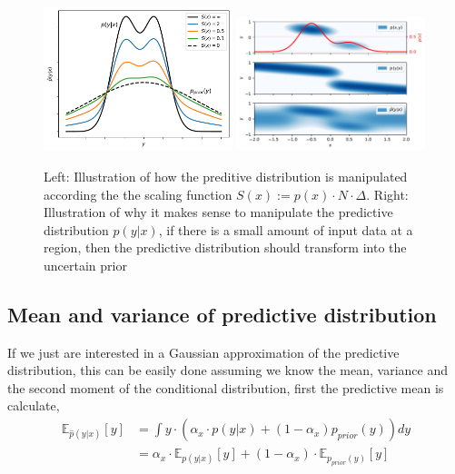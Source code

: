 \begin{figure}[H]
    \centering
    \includegraphics[trim=0.3cm 0cm 0.1cm 0.2cm,clip,width=0.49\textwidth]{Pictures/mixture_predictive_bayesian.pdf}
    \includegraphics[trim=0.3cm 0cm 0.1cm 0.2cm,clip,width=0.49\textwidth]{Pictures/mixture_predictive_bayesian2D.pdf}
    \caption{Left: Illustration of how the preditive distribution is manipulated according
    the the scaling function $S(x) := p(x)\cdot N\cdot \Delta$. Right: Illustration of why it makes
    sense to manipulate the predictive distribution $p(y|x)$, if there is a small amount of input data
    at a region, then the predictive distribution should transform into the uncertain prior}
    \label{pred_dist_manipulation}
\end{figure}

\subsection{Mean and variance of predictive distribution}\label{mean_variance_pred_mixture}
If we just are interested in a Gaussian approximation of the predictive
distribution, this can be easily done assuming we know the mean, variance
and the second moment of the conditional distribution, first the predictive mean
is calculate, 
\begin{align*}
    \mathbb{E}_{\hat p(y|x)}[y] &= \int y \cdot \left(\alpha_x \cdot p(y|x) + (1-\alpha_x) p_{prior}(y)\right) dy\\
    &= \alpha_x\cdot \mathbb{E}_{p(y|x)}[y] + (1-\alpha_x)\cdot \mathbb{E}_{p_{prior}(y)}[y]
\end{align*}

